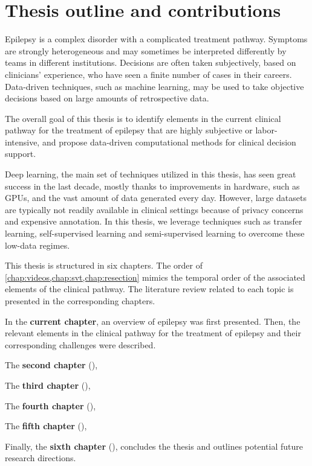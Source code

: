 \section{Thesis outline and contributions}


Epilepsy is a complex disorder with a complicated treatment pathway.
Symptoms are strongly heterogeneous and may sometimes be interpreted differently by teams in different institutions.
Decisions are often taken subjectively, based on clinicians' experience, who have seen a finite number of cases in their careers.
Data-driven techniques, such as machine learning, may be used to take objective decisions based on large amounts of retrospective data.

The overall goal of this thesis is to identify elements in the current clinical pathway for the treatment of epilepsy that are highly subjective or labor-intensive, and propose data-driven computational methods for clinical decision support.

Deep learning, the main set of techniques utilized in this thesis, has seen great success in the last decade, mostly thanks to improvements in hardware, such as \acp{GPU}, and the vast amount of data generated every day.
However, large datasets are typically not readily available in clinical settings because of privacy concerns and expensive annotation.
In this thesis, we leverage techniques such as transfer learning, self-supervised learning and semi-supervised learning to overcome these low-data regimes.

This thesis is structured in six chapters.
The order of \cref{chap:videos,chap:svt,chap:resection} mimics the temporal order of the associated elements of the clinical pathway.
The literature review related to each topic is presented in the corresponding chapters.

In the \textbf{current chapter}, an overview of epilepsy was first presented.
Then, the relevant elements in the clinical pathway for the treatment of epilepsy and their corresponding challenges were described.

The \textbf{second chapter} (),

The \textbf{third chapter} (),

The \textbf{fourth chapter} (),

The \textbf{fifth chapter} (),

Finally, the \textbf{sixth chapter} (), concludes the thesis and outlines potential future research directions.
